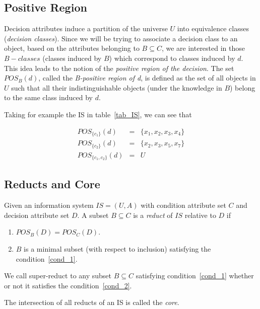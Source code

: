 \documentclass[citenumber]{llncs}
\begin{document}
\subsection{Positive Region}\label{subsect_Pos}
  Decision attributes induce a partition of the universe $U$ into equivalence classes 
  (\textit{decision classes}). Since we will be trying to associate a decision class to an object, 
  based on the attributes belonging to $B \subseteq C$, we are interested in those 
  $B-classes$ (classes induced by $B$) which correspond to classes induced by $d$. 
  This idea leads to the notion of the  \textit{positive region of the decision}. The set $POS_B(d)$, 
  called the \textit{B-positive region of d}, is defined as the set of all objects in $U$ such 
  that all their indistinguishable objects (under the knowledge in $B$) belong to the same class induced 
  by $d$.
  
  Taking for example the IS in table~\ref{tab_IS}, we can see that
  
  $$\begin{array}{lcc}
  POS_{\lbrace c_1 \rbrace}(d)     &=& \lbrace x_1,x_2,x_3,x_4 \rbrace\\
  POS_{\lbrace c_2 \rbrace}(d)     &=& \lbrace x_2,x_3,x_5,x_7 \rbrace\\
  POS_{\lbrace c_1, c_2 \rbrace}(d)&=& U
  \end{array}$$
 
\subsection{Reducts and Core}\label{def_reduct}
  Given an information system $IS=(U,A)$ with condition attribute set $C$ and decision attribute set
  $D$. A subset $B \subseteq C$ is a \textit{reduct} 
  of $IS$ relative to $D$ if
  \begin{enumerate}
  	\item $POS_B(D)=POS_C(D)$. \label{cond_1}
  	\item $B$ is a minimal subset (with respect to inclusion) satisfying the condition~\ref{cond_1}.\label{cond_2}
  \end{enumerate}

  We call super-reduct to any subset $B \subseteq C$ satisfying condition~\ref{cond_1} whether  or not it satisfies the condition~\ref{cond_2}.
  
  The intersection of all reducts of an IS is called the \textit{core}.
  
\end{document}

